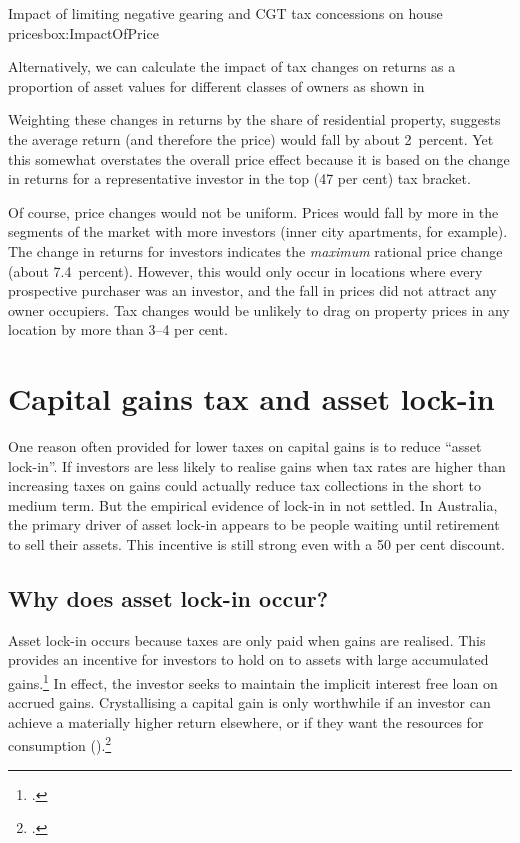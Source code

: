 \documentclass[continuous]{grattan}
\begin{document}
\begin{bigbox*}{Impact of limiting negative gearing {and CGT} tax concessions on house prices}{box:ImpactOfPrice}
\begin{table}[H]
{}

\end{table}

Alternatively, we can calculate the impact of tax changes on returns as a proportion of asset values for different classes of owners as shown in

Weighting these changes in returns by the share of residential property, suggests the average return (and therefore the price) would fall by about 2~percent. Yet this somewhat overstates the overall price effect because it is based on the change in returns for a representative investor in the top (47 per cent) tax bracket.

Of course, price changes would not be uniform. Prices would fall by more in the segments of the market with more investors (inner city apartments, for example). The change in returns for investors indicates the \emph{maximum} rational price change (about 7.4~percent). However, this would only occur in locations where every prospective purchaser was an investor, and the fall in prices did not attract any owner occupiers. Tax changes would be unlikely to drag on property prices in any location by more than 3--4 per cent.

\end{bigbox*}

\chapter{Capital gains tax and asset lock-in}\label{appendix:CGT-asset-lock-in}
One reason often provided for lower taxes on capital gains is to reduce ``asset lock-in''. If investors are less likely to realise gains when tax rates are higher than increasing taxes on gains could actually reduce tax collections in the short to medium term. But the empirical evidence of lock-in in not settled. In Australia, the primary driver of asset lock-in appears to be people waiting until retirement to sell their assets. This incentive is still strong even with a 50 per cent discount. 

\section{Why does asset lock-in occur?}
Asset lock-in occurs because taxes are only paid when gains are realised. This provides an incentive for investors to hold on to assets with large accumulated gains.\footcite{Burman2009}  In effect, the investor seeks to maintain the implicit interest free loan on accrued gains. Crystallising a capital gain is only worthwhile if an investor can achieve a materially higher return elsewhere, or if they want the resources for consumption ().\footcite[][12]{Ingles2009a}   
\end{document}
